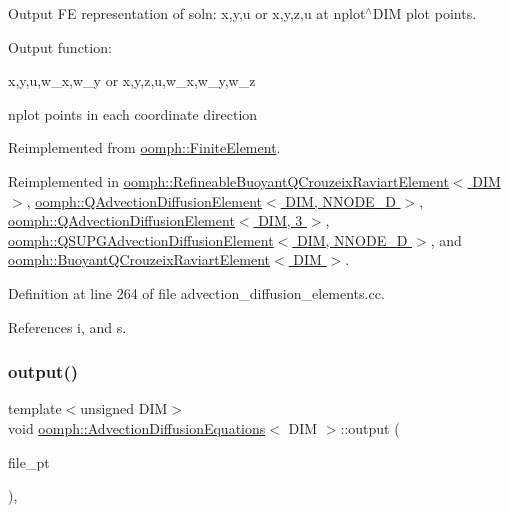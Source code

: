 Output FE representation of soln\+: x,y,u or x,y,z,u at nplot$^\wedge$\+D\+IM plot points. 

Output function\+:

x,y,u,w\+\_\+x,w\+\_\+y or x,y,z,u,w\+\_\+x,w\+\_\+y,w\+\_\+z

nplot points in each coordinate direction 

Reimplemented from \hyperlink{classoomph_1_1FiniteElement_afa9d9b2670f999b43e6679c9dd28c457}{oomph\+::\+Finite\+Element}.



Reimplemented in \hyperlink{classoomph_1_1RefineableBuoyantQCrouzeixRaviartElement_a36bc6dc9052947f0932a605dd4d0e8f0}{oomph\+::\+Refineable\+Buoyant\+Q\+Crouzeix\+Raviart\+Element$<$ D\+I\+M $>$}, \hyperlink{classoomph_1_1QAdvectionDiffusionElement_a248d31c455b267075d437ae2833540c6}{oomph\+::\+Q\+Advection\+Diffusion\+Element$<$ D\+I\+M, N\+N\+O\+D\+E\+\_\+D $>$}, \hyperlink{classoomph_1_1QAdvectionDiffusionElement_a248d31c455b267075d437ae2833540c6}{oomph\+::\+Q\+Advection\+Diffusion\+Element$<$ D\+I\+M, 3 $>$}, \hyperlink{classoomph_1_1QSUPGAdvectionDiffusionElement_a9055a63b9b8c9f3bf606192e52413326}{oomph\+::\+Q\+S\+U\+P\+G\+Advection\+Diffusion\+Element$<$ D\+I\+M, N\+N\+O\+D\+E\+\_\+D $>$}, and \hyperlink{classoomph_1_1BuoyantQCrouzeixRaviartElement_a855783400ac22a61e151d1611ad8e47e}{oomph\+::\+Buoyant\+Q\+Crouzeix\+Raviart\+Element$<$ D\+I\+M $>$}.



Definition at line 264 of file advection\+\_\+diffusion\+\_\+elements.\+cc.



References i, and s.

\mbox{\label{classoomph_1_1AdvectionDiffusionEquations_a063f08a2825608d32eaac5666c2ccec5}} 
\subsubsection{\texorpdfstring{output()}{output()}\hspace{0.1cm}{\footnotesize\ttfamily [3/4]}}
{\footnotesize\ttfamily template$<$unsigned D\+IM$>$ \\
void \hyperlink{classoomph_1_1AdvectionDiffusionEquations}{oomph\+::\+Advection\+Diffusion\+Equations}$<$ D\+IM $>$\+::output (\begin{DoxyParamCaption}\item[{F\+I\+LE $\ast$}]{file\+\_\+pt }\end{DoxyParamCaption})\hspace{0.3cm}{\ttfamily [inline]}, {\ttfamily [virtual]}}



